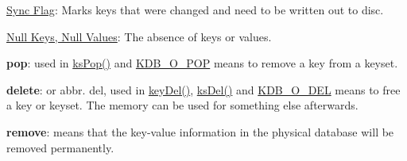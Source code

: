 \begin{DoxyItemize}
\item \hyperlink{doc_help_elektra-sync-flag_md}{Sync Flag}\+: Marks keys that were changed and need to be written out to disc.
\item \hyperlink{doc_help_elektra-values_md}{Null Keys, Null Values}\+: The absence of keys or values.
\item {\bfseries pop}\+: used in {\ttfamily \hyperlink{group__keyset_gae42530b04defb772059de0600159cf69}{ks\+Pop()}} and \hyperlink{group__keyset_ggada05f4bbf46fde81d0d57df86e73d914a52fb5f2cc86773d393da62bebebf7984}{K\+D\+B\+\_\+\+O\+\_\+\+P\+OP} means to remove a key from a keyset.
\item {\bfseries delete}\+: or abbr. del, used in {\ttfamily \hyperlink{group__key_ga3df95bbc2494e3e6703ece5639be5bb1}{key\+Del()}}, {\ttfamily \hyperlink{group__keyset_ga27e5c16473b02a422238c8d970db7ac8}{ks\+Del()}} and \hyperlink{group__keyset_ggada05f4bbf46fde81d0d57df86e73d914a66a5380c120f25f28f49848c4a863ead}{K\+D\+B\+\_\+\+O\+\_\+\+D\+EL} means to free a key or keyset. The memory can be used for something else afterwards.
\item {\bfseries remove}\+: means that the key-\/value information in the physical database will be removed permanently. 
\end{DoxyItemize}